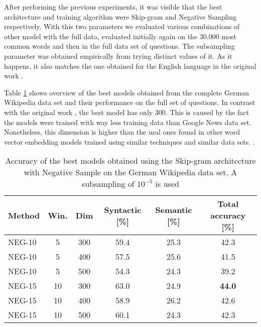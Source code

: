 After performing the previous experiments, it was visible that the best
architecture and training algorithm were Skip-gram and Negative Sampling
respectively. With this two parameters we evaluated various combinations of
other model with the full data, evaluated initially again on the 30.000 most
common words  and then in the full data set of questions. The subsampling
parameter was obtained empirically from trying distinct values of it. As it
happens, it also matches the one obtained for the English language in the
original work \cite{DBLP:journals/corr/abs-1301-3781}.





Table \ref{tab:main_results} shows  overview of the best models obtained from
the complete German Wikipedia data set  and their performance on the full set
of questions. In contrast with the original work
\cite{MikolovSCCD13} \cite{DBLP:journals/corr/abs-1301-3781} , the best model
has only 300. This is caused by the fact the models were trained with way
less training data than Google News data set. Nonetheless, this dimension is
higher than the usal ones found in other word vector embedding models
trained using similar techniques and similar data
sets.\cite{Turian:2010:WRS:1858681.1858721} \cite{DBLP:journals/corr/abs-1103-0398}.

\begin{table}[h]
\centering
\small
\caption{Accuracy of the best models obtained using the Skip-gram
  architecture with Negative Sample on the German Wikipedia data set. A
  subsampling of $10^{-5}$ is used} 
\label{tab:main_results}





\begin{tabular}{|l|c|c|cc|c|}
\hline
Method  &  Win.  &  Dim   &  Syntactic [\%] & Semantic
[\%] &  Total accuracy [\%]  \\
\hline

NEG-10  &   5  &  300  &  59.4  &  25.3  &  42.3  \\
 NEG-10  &   5  &  400  &  57.5  &  25.6  &  41.5  \\
 NEG-10  &   5  &  500  &  54.3  &  24.3  &  39.2  \\
 NEG-15  &  10  &  300  &  63.0  &  24.9  &  \textbf{44.0}  \\
 NEG-15  &  10  &  400  &  58.9  &  26.2  &  42.6  \\
 NEG-15  &  10  &  500  &  60.1  &  24.3  &  42.3  \\
\hline
\end{tabular}
\end{table}

